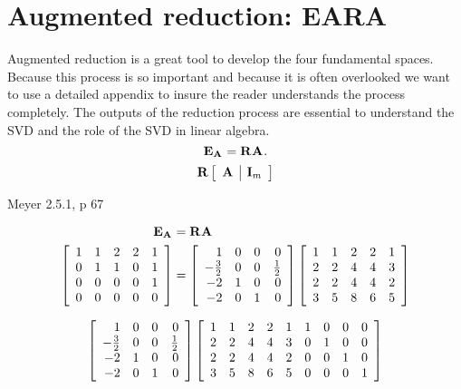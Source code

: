 \chapter{Augmented reduction: EARA}

Augmented reduction is a great tool to develop the four fundamental spaces.
Because this process is so important and because it is often overlooked we want to use a detailed appendix to insure the reader understands the process completely. The outputs of the reduction process are essential to understand the SVD and the role of the SVD in linear algebra.
\begin{equation}
  \E{\A{}} = \R{}\A{}.
\end{equation}
\begin{equation}
  \R{}\mat{c|c}{\A{} & \I{m}}
\end{equation}

Meyer 2.5.1, p 67


\begin{equation}
\begin{split}
  \E{\A{}} &= \R{}\A{}\\
\mat{ccccc}
{
 1 & 1 & 2 & 2 & 1 \\
 0 & 1 & 1 & 0 & 1 \\
 0 & 0 & 0 & 0 & 1 \\
 0 & 0 & 0 & 0 & 0
}
& =
\mat{rrrr}
{
 1 & 0 & 0 & 0 \\
 -\frac{3}{2} & 0 & 0 & \frac{1}{2} \\
 -2 & 1 & 0 & 0 \\
 -2 & 0 & 1 & 0
}
\mat{ccccc}
{
 1 & 1 & 2 & 2 & 1 \\
 2 & 2 & 4 & 4 & 3 \\
 2 & 2 & 4 & 4 & 2 \\
 3 & 5 & 8 & 6 & 5
}
\end{split}
\end{equation}

\begin{equation}
\mat{rrrr}
{
 1 & 0 & 0 & 0 \\
 -\frac{3}{2} & 0 & 0 & \frac{1}{2} \\
 -2 & 1 & 0 & 0 \\
 -2 & 0 & 1 & 0
}
\mat{ccccccccc}
{
 1 & 1 & 2 & 2 & 1 & 1 & 0 & 0 & 0 \\
 2 & 2 & 4 & 4 & 3 & 0 & 1 & 0 & 0 \\
 2 & 2 & 4 & 4 & 2 & 0 & 0 & 1 & 0 \\
 3 & 5 & 8 & 6 & 5 & 0 & 0 & 0 & 1 
} 
\end{equation}


